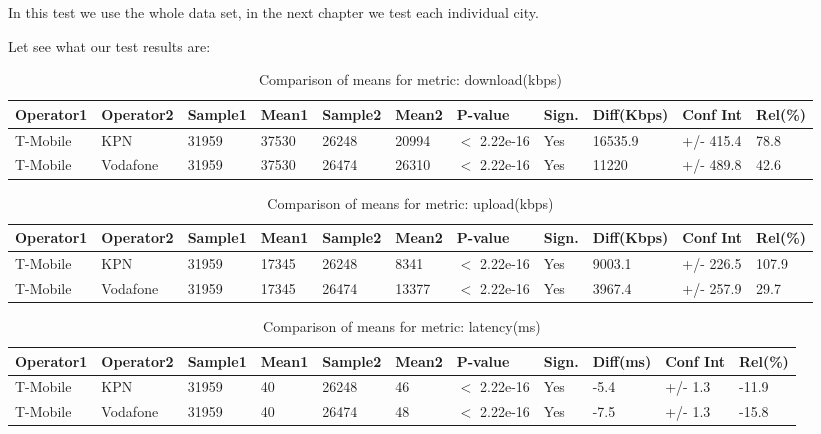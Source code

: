 \documentclass[]{article}
\begin{document}
In this test we use the whole data set, in the next chapter we test each
individual city.

Let see what our test results are:

\begin{table}[ht]
\centering
{\footnotesize
\begin{tabular}{lllllllllll}
  \hline
Operator1 & Operator2 & Sample1 & Mean1 & Sample2 & Mean2 & P-value & Sign. & Diff(Kbps) & Conf Int & Rel(\%) \\ 
  \hline
T-Mobile & KPN & 31959 & 37530 & 26248 & 20994 & $<$ 2.22e-16 & Yes & 16535.9 & +/- 415.4 & 78.8 \\ 
  T-Mobile & Vodafone & 31959 & 37530 & 26474 & 26310 & $<$ 2.22e-16 & Yes & 11220 & +/- 489.8 & 42.6 \\ 
   \hline
\end{tabular}
}
\caption{Comparison of means for metric: download(kbps)} 
\end{table}

\begin{table}[ht]
\centering
{\footnotesize
\begin{tabular}{lllllllllll}
  \hline
Operator1 & Operator2 & Sample1 & Mean1 & Sample2 & Mean2 & P-value & Sign. & Diff(Kbps) & Conf Int & Rel(\%) \\ 
  \hline
T-Mobile & KPN & 31959 & 17345 & 26248 & 8341 & $<$ 2.22e-16 & Yes & 9003.1 & +/- 226.5 & 107.9 \\ 
  T-Mobile & Vodafone & 31959 & 17345 & 26474 & 13377 & $<$ 2.22e-16 & Yes & 3967.4 & +/- 257.9 & 29.7 \\ 
   \hline
\end{tabular}
}
\caption{Comparison of means for metric: upload(kbps)} 
\end{table}

\begin{table}[ht]
\centering
{\footnotesize
\begin{tabular}{lllllllllll}
  \hline
Operator1 & Operator2 & Sample1 & Mean1 & Sample2 & Mean2 & P-value & Sign. & Diff(ms) & Conf Int & Rel(\%) \\ 
  \hline
T-Mobile & KPN & 31959 & 40 & 26248 & 46 & $<$ 2.22e-16 & Yes & -5.4 & +/- 1.3 & -11.9 \\ 
  T-Mobile & Vodafone & 31959 & 40 & 26474 & 48 & $<$ 2.22e-16 & Yes & -7.5 & +/- 1.3 & -15.8 \\ 
   \hline
\end{tabular}
}
\caption{Comparison of means for metric: latency(ms)} 
\end{table}
\end{document}
